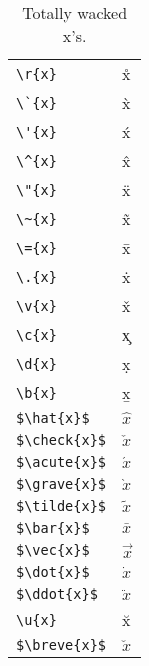 \documentclass{article}
\begin{document}
\begin{table}
\begin{center}
\begin{tabular}{ll}
\verb#\r{x}#& \r{x}\\
\verb#\`{x}#& \`{x}\\
\verb#\'{x}#& \'{x}\\
\verb#\^{x}#& \^{x}\\
\verb#\"{x}#& \"{x}\\
\verb#\~{x}#& \~{x}\\
\verb#\={x}#& \={x}\\
\verb#\.{x}#& \.{x}\\
\verb#\v{x}#& \v{x}\\
\verb#\c{x}#& \c{x}\\
\verb#\d{x}#& \d{x}\\
\verb#\b{x}#& \b{x}\\
\verb#$\hat{x}$#& $\hat{x}$\\
\verb#$\check{x}$#& $\check{x}$\\
\verb#$\acute{x}$#& $\acute{x}$\\
\verb#$\grave{x}$#& $\grave{x}$\\
\verb#$\tilde{x}$#& $\tilde{x}$\\
\verb#$\bar{x}$#& $\bar{x}$\\
\verb#$\vec{x}$#& $\vec{x}$\\
\verb#$\dot{x}$#& $\dot{x}$\\
\verb#$\ddot{x}$#& $\ddot{x}$\\
\verb#\u{x}#& \u{x}\\
\verb#$\breve{x}$#& $\breve{x}$
\end{tabular}
\caption{Totally wacked x's.}
\end{center}
\end{table}
\pagebreak
\end{document}
